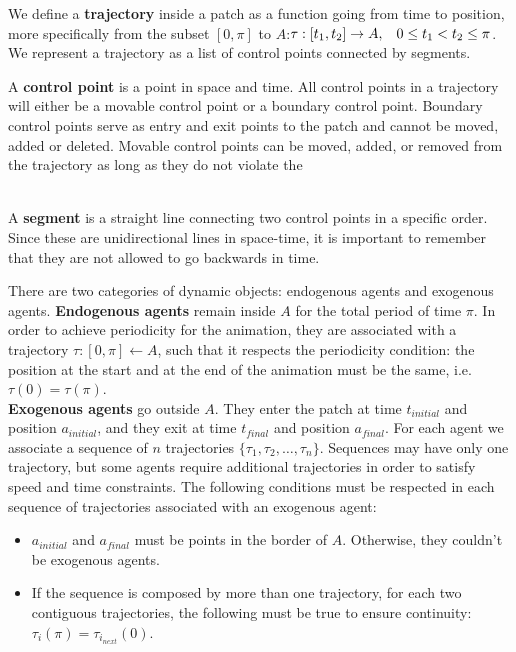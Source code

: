 We define a {\bf trajectory} inside a patch as a function going from time to position, more specifically from the subset $[ 0,\pi ]$ to $A$:$ \tau:[t_1,t_2]\rightarrow A, \hspace{0.3cm} 0 \leq t_1 < t_2 \leq \pi$. We represent a trajectory as a list of control points connected by segments. 

A {\bf control point} is a point in space and time. All control points in a trajectory will either be a movable control point or a boundary control point. Boundary control points serve as entry and exit points to the patch and cannot be moved, added or deleted. Movable control points can be moved, added, or removed from the trajectory as long as they do not violate the  \\
\\

A {\bf segment} is a straight line connecting two control points in a specific order. Since these are unidirectional lines in space-time, it is important to remember that they are not allowed to go backwards in time.

There are two categories of dynamic objects: endogenous agents and exogenous agents. {\bf Endogenous agents} remain inside $A$ for the total period of time $\pi$. In order to achieve periodicity for the animation, they are associated with a trajectory $\tau : [0,\pi] \leftarrow A$, such that it respects the periodicity condition: the position at the start and at the end of the animation must be the same, i.e. \mbox{$\tau (0) = \tau (\pi)$}.\\
{\bf Exogenous agents} go outside $A$. They enter the patch at time $t_{initial}$ and position $a_{initial}$, and they exit at time $t_{final}$ and position $a_{final}$. For each agent we associate a sequence of $n$ trajectories $\{ \tau_1, \tau_2, \dots, \tau_n\}$. Sequences may have only one trajectory, but some agents require additional trajectories in order to satisfy speed and time constraints. The following conditions must be respected in each sequence of trajectories associated with an exogenous agent:

\begin{itemize}

\item{$a_{initial}$ and $a_{final}$ must be points in the border of $A$. Otherwise, they couldn't be exogenous agents.}

\item{If the sequence is composed by more than one trajectory, for each two contiguous trajectories, the following must be true to ensure continuity: $\tau_i(\pi) = \tau_{i_{next}}(0)$.}

\end{itemize}

